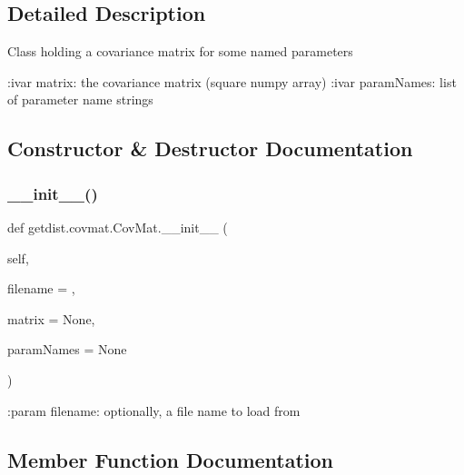 \subsection{Detailed Description}
\begin{DoxyVerb}Class holding a covariance matrix for some named parameters

:ivar matrix: the covariance matrix  (square numpy array)
:ivar paramNames: list of parameter name strings
\end{DoxyVerb}
 

\subsection{Constructor \& Destructor Documentation}
\mbox{\label{classgetdist_1_1covmat_1_1CovMat_a3b43667e56d23152e5d8970bdd911623}} 
\subsubsection{\texorpdfstring{\+\_\+\+\_\+init\+\_\+\+\_\+()}{\_\_init\_\_()}}
{\footnotesize\ttfamily def getdist.\+covmat.\+Cov\+Mat.\+\_\+\+\_\+init\+\_\+\+\_\+ (\begin{DoxyParamCaption}\item[{}]{self,  }\item[{}]{filename = {\ttfamily \textquotesingle{}\textquotesingle{}},  }\item[{}]{matrix = {\ttfamily None},  }\item[{}]{param\+Names = {\ttfamily None} }\end{DoxyParamCaption})}

\begin{DoxyVerb}:param filename: optionally, a file name to load from\end{DoxyVerb}
 

\subsection{Member Function Documentation}
\mbox{\label{classgetdist_1_1covmat_1_1CovMat_a17725849ae798508a7fa2847ecb06d8c}} 
